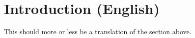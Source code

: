 \chapter{Introduction (English)}
\label{chap:intro-en}

This should more or less be a translation of the section above.